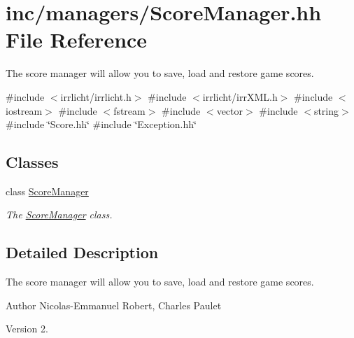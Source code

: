\hypertarget{ScoreManager_8hh}{}\section{inc/managers/\+Score\+Manager.hh File Reference}
\label{ScoreManager_8hh}


The score manager will allow you to save, load and restore game scores.  


{\ttfamily \#include $<$irrlicht/irrlicht.\+h$>$}\newline
{\ttfamily \#include $<$irrlicht/irr\+X\+M\+L.\+h$>$}\newline
{\ttfamily \#include $<$iostream$>$}\newline
{\ttfamily \#include $<$fstream$>$}\newline
{\ttfamily \#include $<$vector$>$}\newline
{\ttfamily \#include $<$string$>$}\newline
{\ttfamily \#include \char`\"{}Score.\+hh\char`\"{}}\newline
{\ttfamily \#include \char`\"{}Exception.\+hh\char`\"{}}\newline
\subsection*{Classes}
\begin{DoxyCompactItemize}
\item 
class \hyperlink{classScoreManager}{Score\+Manager}
\begin{DoxyCompactList}\small\item\em The \hyperlink{classScoreManager}{Score\+Manager} class. \end{DoxyCompactList}\end{DoxyCompactItemize}


\subsection{Detailed Description}
The score manager will allow you to save, load and restore game scores. 

\begin{DoxyAuthor}{Author}
Nicolas-\/\+Emmanuel Robert, Charles Paulet 
\end{DoxyAuthor}
\begin{DoxyVersion}{Version}
2. 
\end{DoxyVersion}
